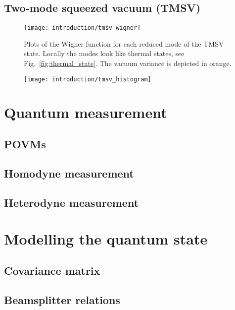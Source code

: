 \subsection{Two-mode squeezed vacuum (TMSV)}
\begin{figure}[htp]
\centering
\texttt{[image: introduction/tmsv\_wigner]}
\caption{\label{fig:tmsv_wigner} Plots of the Wigner function for each reduced mode of the TMSV state. Locally the modes look like thermal states, see Fig.~\ref{fig:thermal_state}. The vacuum variance is depicted in orange.}
\end{figure}

\begin{figure}[htp]
\centering
\texttt{[image: introduction/tmsv\_histogram]}
\caption{\label{fig:tmsv_histogram} }
\end{figure}

\section{Quantum measurement}

\subsection{POVMs}

\subsection{Homodyne measurement}

\subsection{Heterodyne measurement}

\section{Modelling the quantum state}

\subsection{Covariance matrix}

\subsection{Beamsplitter relations}

